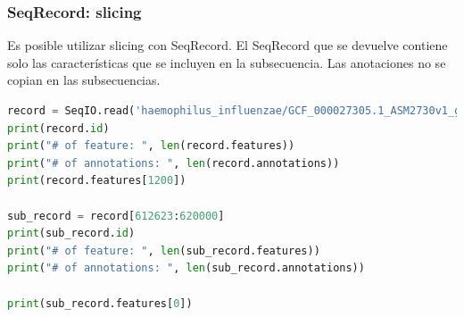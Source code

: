 \subsubsection{SeqRecord: slicing}
Es posible utilizar slicing con SeqRecord. El SeqRecord que se devuelve contiene solo las características que se incluyen en la subsecuencia. Las anotaciones no se copian en las subsecuencias.

\begin{lstlisting}[language=Python]
record = SeqIO.read('haemophilus_influenzae/GCF_000027305.1_ASM2730v1_genomic.gbff', 'genbank')
print(record.id)
print("# of feature: ", len(record.features))
print("# of annotations: ", len(record.annotations))
print(record.features[1200])

sub_record = record[612623:620000]
print(sub_record.id)
print("# of feature: ", len(sub_record.features))
print("# of annotations: ", len(sub_record.annotations))

print(sub_record.features[0])
\end{lstlisting}
    